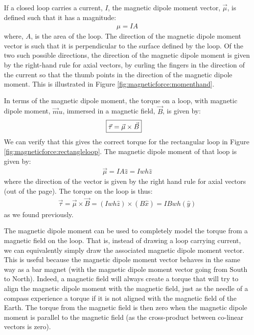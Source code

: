 If a closed loop carries a current, $I$, the magnetic dipole moment vector, $\vec \mu$, is defined such that it has a magnitude:
\begin{align*}
\mu = IA
\end{align*}
where, $A$, is the area of the loop. The direction of the magnetic dipole moment vector is such that it is perpendicular to the surface defined by the loop. Of the two such possible directions, the direction of the magnetic dipole moment is given by the right-hand rule for axial vectors, by curling the fingers in the direction of the current so that the thumb points in the direction of the magnetic dipole moment. This is illustrated in Figure \ref{fig:magneticforce:momenthand}.

In terms of the magnetic dipole moment, the torque on a loop, with magnetic dipole moment, $\vec mu$, immersed in a magnetic field, $\vec B$, is given by:
\begin{align*}
\Aboxed{\vec \tau = \vec \mu \times \vec B}
\end{align*}
We can verify that this gives the correct torque for the rectangular loop in Figure \ref{fig:magneticforce:rectangleloop}. The magnetic dipole moment of that loop is given by:
\begin{align*}
\vec \mu = IA \hat z = Iwh\hat z
\end{align*}
where the direction of the vector is given by the right hand rule for axial vectors (out of the page). The torque on the loop is thus:
\begin{align*}
\vec \tau = \vec \mu \times \vec B = (Iwh\hat z) \times (B\hat x) = IBwh (\hat y)
\end{align*}
as we found previously.

The magnetic dipole moment can be used to completely model the torque from a magnetic field on the loop. That is, instead of drawing a loop carrying current, we can equivalently simply draw the associated magnetic dipole moment vector. This is useful because the magnetic dipole moment vector behaves in the same way as a bar magnet (with the magnetic dipole moment vector going from South to North). Indeed, a magnetic field will always create a torque that will try to align the magnetic dipole moment with the magnetic field, just as the needle of a compass experience a torque if it is not aligned with the magnetic field of the Earth. The torque from the magnetic field is then zero when the magnetic dipole moment is parallel to the magnetic field (as the cross-product between co-linear vectors is zero). 


